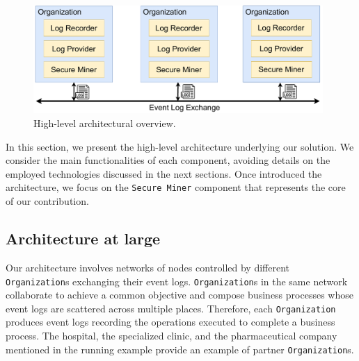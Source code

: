 \begin{figure}[t]
\centering
\includegraphics[width=11cm]{content/figures/architecture_diagram.pdf}
\caption{High-level architectural overview.}
\label{fig:architecture_diagram}
\end{figure}
In this section, we present the high-level architecture underlying our solution. We consider the main functionalities of each component, avoiding details on the employed technologies discussed in the next sections. Once introduced the architecture, we focus on the \texttt{Secure Miner} component that represents the core of our contribution.

\subsection{Architecture at large}
Our architecture involves networks of nodes controlled by different \texttt{Organization}s exchanging their event logs. \texttt{Organization}s in the same network collaborate to achieve a common objective and compose business processes whose event logs are scattered across multiple places. Therefore, each \texttt{Organization} produces event logs recording the operations executed to complete a business process. The hospital, the specialized clinic, and the pharmaceutical company mentioned in the running example provide an example of partner \texttt{Organization}s.

